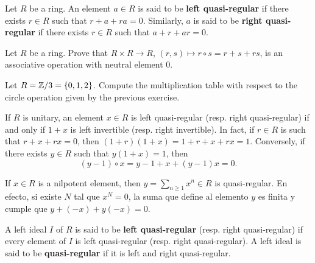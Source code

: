 \begin{definition}
Let $R$ be a ring. An element $a\in R$ is said to be 
\textbf{left quasi-regular} if there exists $r\in R$ such that $r+a+ra=0$. Similarly, 
$a$ is said to be \textbf{right quasi-regular} if there exists $r\in R$ such that $a+r+ar=0$. 
\end{definition}

\begin{exercise}
	\label{exercise:circ}
	Let $R$ be a ring. Prove that $R\times R\to R$,
	$(r,s)\mapsto r\circ s=r+s+rs$, is an associative operation with neutral element $0$.
\end{exercise}

\begin{exercise}
	Let $R=\mathbb{Z}/3=\{0,1,2\}$. Compute the multiplication table with respect to the circle 
 	operation given by the previous exercise.  
\end{exercise}

If $R$ is unitary, an element $x\in R$ is left quasi-regular (resp. right quasi-regular)
if and only if $1+x$ is left invertible (resp. right invertible). In fact, 
if $r\in R$ is such that $r+x+rx=0$, then $(1+r)(1+x)=1+r+x+rx=1$.
Conversely, if there exists $y\in R$ such that $y(1+x)=1$, then  
\[
(y-1)\circ x=y-1+x+(y-1)x=0.
\]

\begin{example}
	If $x\in R$ is a nilpotent element, then $y=\sum_{n\geq1}x^n\in R$ is quasi-regular. 
	En efecto, si existe $N$ tal que $x^N=0$, la suma que
	define al elemento $y$ es finita y cumple que $y+(-x)+y(-x)=0$.  
\end{example}

\begin{definition}
A left ideal $I$ of $R$ is said to be 
\textbf{left quasi-regular} (resp. right quasi-regular) if every element of $I$ is
left quasi-regular (resp. right quasi-regular). A left ideal 
is said to be \textbf{quasi-regular} if it is left and right quasi-regular. 
\end{definition}

